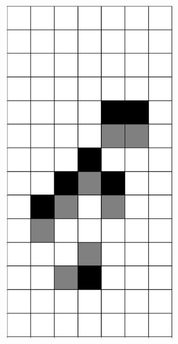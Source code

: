 \documentclass[12pt]{article}
\numberwithin{figure}{section} %
\begin{document}
\begin{figure}[H]
\begin{subfigure}{0.19\textwidth}
     \centering
     \includegraphics[width=\linewidth]{Section4/16.1}
     \subcaption{}
   \end{subfigure}
        \begin{subfigure}{0.19\textwidth}
     \centering

\end{subfigure}
\end{figure}
\end{document}
